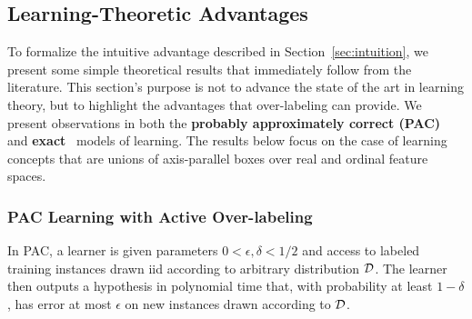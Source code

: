 \subsection{Learning-Theoretic Advantages}
\label{sec:learningtheory}

To formalize the intuitive advantage described in
Section~\ref{sec:intuition}, we present some simple theoretical
results that immediately follow from the literature.  This
section's purpose is not to advance the state of the art in 
learning theory, but to highlight the advantages that over-labeling
can provide.
We present observations in both the {\bf probably approximately correct
(PAC)}~\cite{v-tl-84} and {\bf exact}~\cite{a-lrsqc-87} models of learning. 
The results below focus on the 
case of learning concepts
that are unions of axis-parallel boxes 
over real and  ordinal feature spaces.  

\subsubsection{PAC Learning with Active Over-labeling}
In PAC, a learner is given parameters $0<\epsilon,\delta < 1/2$ 
and access to labeled training instances
drawn iid according to arbitrary distribution $\cal D$.  The
learner then outputs a hypothesis in polynomial time that,
with probability at least $1-\delta$, has error at most
$\epsilon$ on new instances drawn according to $\cal D$.  

